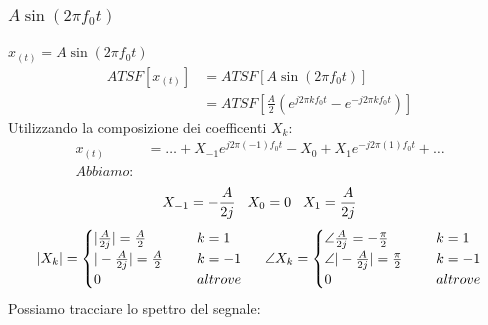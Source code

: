             \subsubsection{$A\sin(2\pi f_0 t)$}
                $x_{(t)}=A\sin(2\pi f_0 t)$
                \begin{align}
                    ATSF[x_{(t)}] & = ATSF[A\sin(2\pi f_0 t)] \nonumber \\
                        & = ATSF[\frac{A}{2} (e^{j2\pi kf_0t} - e^{-j2\pi kf_0t})] \nonumber 
                \end{align}
                Utilizzando la composizione dei coefficenti $X_k$:
                \begin{align}
                    x_{(t)} & =\ldots  + X_{-1} e^{j2\pi (-1)f_0t} - X_{0} + X_{1} e^{-j2\pi (1) f_0t} + \ldots \nonumber\\
                    Abbiamo:& \nonumber 
                \end{align}
                        \[X_{-1} = -\frac{A}{2j}\hspace{.3cm} X_{0} = 0\hspace{.3cm} X_{1} = \frac{A}{2j}\] 
                \[
                    |X_k|= 
                    \begin{cases}
                            |\frac{A}{2j}| = \frac{A}{2} \hspace{0.5cm} & k= 1\\
                            |-\frac{A}{2j}| = \frac{A}{2} \hspace{0.5cm} & k= -1\\
                            0 \hspace{0.5cm} & altrove  \\
                    \end{cases}
                    \hspace{0.5cm}
                    \angle X_k= 
                    \begin{cases}
                        \angle \frac{A}{2j} = -\frac{\pi}{2} \hspace{0.5cm} & k= 1\\
                        \angle |-\frac{A}{2j}| = \frac{\pi}{2} \hspace{0.5cm} & k= -1\\
                        0 \hspace{0.5cm} & altrove  \\
                    \end{cases}
                    \]
                Possiamo tracciare lo spettro del segnale:
